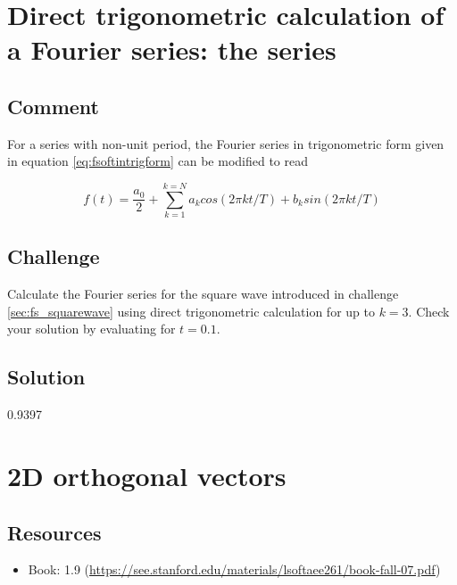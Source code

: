 \timebox




\newpage
\section{Direct trigonometric calculation of a Fourier series: the series}

\subsection*{Comment}
For a series with non-unit period, the Fourier series in trigonometric form given in equation \ref{eq:fsoftintrigform} can be modified to read

\begin{equation}
    \label{eq:fstrignonunit}
    f(t) = \frac{a_0}{2} + \sum_{k=1}^{k=N} a_k cos(2 \pi k t/T) + b_k sin(2 \pi k t/T)
\end{equation}

\subsection*{Challenge}
Calculate the Fourier series for the square wave introduced in challenge \ref{sec:fs_squarewave} using direct trigonometric calculation for up to $k=3$. Check your solution by evaluating for $t=0.1$.

\subsection*{Solution}
0.9397


\timebox




\newpage
\section{2D orthogonal vectors}

\subsection*{Resources}
\begin{itemize}
    \item Book: 1.9 (\url{https://see.stanford.edu/materials/lsoftaee261/book-fall-07.pdf})
\end{itemize}

